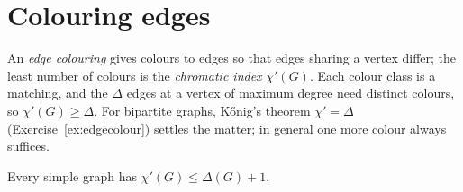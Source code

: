 \section{Colouring edges}

An \emph{edge colouring} gives colours to edges so that edges sharing a vertex differ; the least number of colours is the \emph{chromatic index} $\chi'(G)$. Each
colour class is a matching, and the $\Delta$ edges at a vertex of maximum degree need distinct colours, so $\chi'(G)\ge\Delta$. For bipartite graphs, K\H onig's
theorem $\chi'=\Delta$ (Exercise~\ref{ex:edgecolour}) settles the matter; in general one more colour always suffices.

\begin{theorem}[Vizing, 1964]\label{thm:vizing}
Every simple graph has $\chi'(G)\le\Delta(G)+1$.
\end{theorem}
